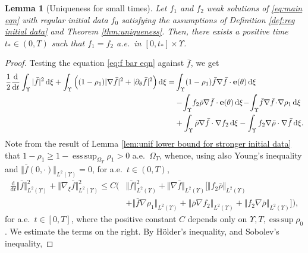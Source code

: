 \documentclass[11pt,a4paper,reqno]{amsart}
\newtheorem{lemma}[prop]{Lemma}
\theoremstyle{remark}
\theoremstyle{definition}
\numberwithin{equation}{section}
\DeclareMathOperator{\esssup}{ess \, sup}
\newcommand{\e}{{\bf e}}
\newcommand{\bxi}{\xi}
\renewcommand{\d}{\, \mathrm{d} }
\newcommand{\der}{\mathrm{d}}
\begin{document}
\begin{lemma}[Uniqueness for small times]\label{lem:uniqueness small times}
    Let $f_1$ and $f_2$ weak solutions of \eqref{eq:main eqn} with regular initial data $f_0$ satisfying the assumptions of Definition \ref{def:reg initial data} and Theorem \ref{thm:uniqueness}. Then, there exists a positive time $t_* \in (0,T)$ such that $f_1 = f_2$ a.e.~in $[0,t_*] \times \Upsilon$. 
\end{lemma}
\begin{proof}
Testing the equation \eqref{eq:f bar eqn} against $\bar{f}$, we get 
\begin{equation*}
    \begin{aligned}
        \frac{1}{2}\frac{\der}{\der t}\int_\Upsilon |\bar{f}|^2 \d \bxi + \int_\Upsilon \Big( (1-\rho_1)|\nabla \bar{f}|^2 + |\partial_\theta \bar{f}|^2 \Big) \d \bxi = &\int_\Upsilon (1-\rho_1) \bar{f} \nabla \bar{f} \cdot \e(\theta) \d \bxi \\ 
        &-\!\int_\Upsilon\! f_2 \bar{\rho}\nabla\bar{f}\cdot \e(\theta) \d \bxi \!-\!\int_\Upsilon\! \bar{f} \nabla \bar{f}\! \cdot\! \nabla \rho_1 \d \bxi \\ 
        &+ \int_\Upsilon \bar{\rho}\nabla\bar{f} \cdot \nabla f_2 \d \bxi - \int_\Upsilon f_2 \nabla\bar{\rho} \cdot \nabla \bar{f} \d \bxi. 
    \end{aligned}
\end{equation*}
Note from the result of Lemma \ref{lem:unif lower bound for stronger initial data} that $1-\rho_1 \geq 1-\esssup_{\Omega_T}\rho_1>0$ a.e.~$\Omega_T$, whence, using also Young's inequality and $\Vert\bar{f}(0,\cdot)\Vert_{L^2(\Upsilon)}=0$, for a.e.~$t \in (0,T)$, 
\begin{equation}\label{eq:first H1 bound f bar}
    \begin{aligned}
        \frac{\der}{\der t}\Vert\bar{f} \Vert_{L^2(\Upsilon)}^2\!\! +\!\! \Vert \nabla_{\bxi} \bar{f}\Vert_{L^2(\Upsilon)}^2 \!\leq\! C\Big( \! &\Vert \bar{f} \Vert^2_{L^2(\Upsilon)} \!+ \!\Vert \nabla \bar{f} \Vert_{L^2(\Upsilon)}\big[\Vert f_2 \bar{\rho}\Vert_{L^2(\Upsilon)}  \\ 
        &+\!\Vert \bar{f} \nabla \rho_1 \Vert_{L^2(\Upsilon)} \!+\! \Vert \bar{\rho} \nabla f_2 \Vert_{L^2(\Upsilon)}  \! +\! \Vert f_2 \nabla\bar{\rho} \Vert_{L^2(\Upsilon)}\big] \!\Big), 
    \end{aligned}
\end{equation}
for a.e.~$t \in [0,T]$, where the positive constant $C$ depends only on $\Upsilon,T,\esssup \rho_0$. We estimate the terms on the right. By H\"older's inequality, and Sobolev's inequality, 

\end{proof}
\end{document}
